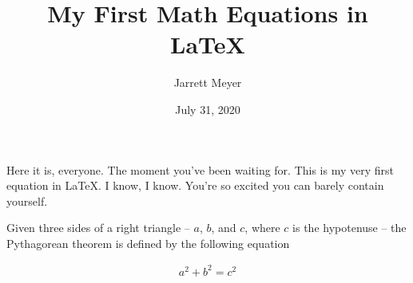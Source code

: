 \documentclass[12pt, letterpaper]{article}
\title{My First Math Equations in \LaTeX}
\author{Jarrett Meyer}
\date{July 31, 2020}
\begin{document}
\maketitle

Here it is, everyone. The moment you've been waiting for. This is my very first equation in \LaTeX. I know, I know. You're so excited you can barely contain yourself.

Given three sides of a right triangle -- $a$, $b$, and $c$, where $c$ is the hypotenuse -- the Pythagorean theorem is defined by the following equation

\begin{align}
	a^2 + b^2 = c^2
\end{align}
\end{document}
